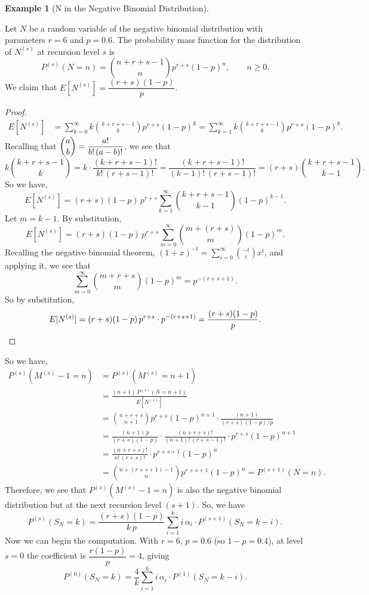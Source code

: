 \documentclass[11pt]{amsart}
\theoremstyle{definition}
\newtheorem{example}{Example}
\theoremstyle{plain}
\begin{document}
\begin{example}[N in the Negative Binomial Distribution]\label{ex:negbin}
Let $N$ be a random variable of the negative binomial distribution with parameters
$r = 6$ and $p = 0.6$.  The probability mass function for the distribution of $N^{(s)}$ at
recursion level $s$ is
\[
    P^{(s)}(N = n) = \binom{n + r + s - 1}{n} p^{r+s}(1-p)^n, \qquad n \geq 0.
\]
We claim that $E[N^{(s)}] = \dfrac{(r+s)(1-p)}{p}$.

\begin{proof}
\begin{align*}
E[N^{(s)}]
    &= \sum_{k=0}^{\infty} k \binom{k + r + s - 1}{k} p^{r+s}(1-p)^k
     = \sum_{k=1}^{\infty} k \binom{k + r + s - 1}{k} p^{r+s}(1-p)^k.
\end{align*}
Recalling that $\dbinom{a}{b} = \dfrac{a!}{b!\,(a-b)!}$, we see that
\[
    k \binom{k + r + s - 1}{k}
    = k \cdot \frac{(k + r + s - 1)!}{k!\,(r + s - 1)!}
    = \frac{(k + r + s - 1)!}{(k-1)!\,(r + s - 1)!}
    = (r+s)\binom{k + r + s - 1}{k - 1}.
\]
So we have,
\[
    E[N^{(s)}]
    = (r+s)(1-p)\,p^{r+s} \sum_{k=1}^{\infty}
      \binom{k + r + s - 1}{k - 1}(1-p)^{k-1}.
\]
Let $m = k - 1$.  By substitution,
\[
    E[N^{(s)}] = (r+s)(1-p)\,p^{r+s}
    \sum_{m=0}^{\infty} \binom{m + (r+s)}{m}(1-p)^m.
\]
Recalling the negative binomial theorem,
$(1+x)^{-t} = \sum_{i=0}^{\infty}\binom{-t}{i} x^i$,
and applying it, we see that
\[
    \sum_{m=0}^{\infty} \binom{m + r + s}{m}(1-p)^m = p^{-(r+s+1)}.
\]
So by substitution,
\[
    E[N^{(s)}]
    = (r+s)(1-p)\,p^{r+s} \cdot p^{-(r+s+1)}
    = \frac{(r+s)(1-p)}{p}. \qedhere
\]
\end{proof}

So we have,
\begin{align*}
P^{(s)}(M^{(s)} - 1 = n)
    &= P^{(s)}(M^{(s)} = n + 1) \\
    &= \frac{(n+1)\,P^{(s)}(N = n+1)}{E[N^{(s)}]} \\
    &= \binom{n + r + s}{n + 1} p^{r+s}(1-p)^{n+1}
       \cdot \frac{(n+1)}{(r+s)(1-p)/p} \\
    &= \frac{(n+1)\,p}{(r+s)(1-p)} \cdot \frac{(n + r + s)!}{(n+1)!\,(r+s-1)!}
       \cdot p^{r+s}(1-p)^{n+1} \\
    &= \frac{(n + r + s)!}{n!\,(r+s)!} \cdot p^{r+s+1}(1-p)^n \\
    &= \binom{n + (r+s+1) - 1}{n} p^{r+s+1}(1-p)^n
     = P^{(s+1)}(N = n).
\end{align*}
Therefore, we see that $P^{(s)}(M^{(s)} - 1 = n)$ is also the negative binomial
distribution but at the next recursion level $(s+1)$.  So, we have
\[
    P^{(s)}(S_N = k)
    = \frac{(r+s)(1-p)}{k\,p} \sum_{i=1}^{k} i\,\alpha_i \cdot P^{(s+1)}(S_N = k - i).
\]
Now we can begin the computation.  With $r = 6$, $p = 0.6$ (so $1-p = 0.4$), at level
$s = 0$ the coefficient is $\dfrac{r(1-p)}{p} = 4$, giving
\[
    P^{(0)}(S_N = k) = \frac{4}{k} \sum_{i=1}^{k} i\,\alpha_i \cdot P^{(1)}(S_N = k - i).
\]


\end{example}
\end{document}
